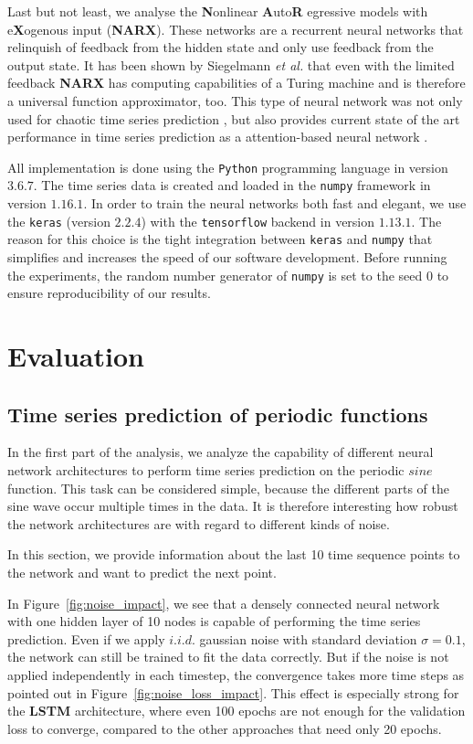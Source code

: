 \documentclass{article}
\begin{document}
Last but not least, we analyse the \textbf{N}onlinear \textbf{A}uto\textbf{R}
egressive models with e\textbf{X}ogenous input (\textbf{NARX}).
These networks are a recurrent
neural networks that relinquish of feedback from the hidden state and only use
feedback from the output state. It has been shown by Siegelmann \textit{et al.}
that even with the limited feedback \textbf{NARX} has computing capabilities of
a Turing machine \cite{siegelmann1997} and is therefore a universal function
approximator, too. This type of neural network was not only used for chaotic
time series prediction \cite{diaconescu2008}, but also provides current
state of the art performance in time series prediction as a attention-based
neural network \cite{qin2017}. 

All implementation is done using the \texttt{Python} programming language in
version $3.6.7$. The time series data is created and loaded in the
\texttt{numpy} framework in version $1.16.1$. In order to train the neural
networks both fast and elegant, we use the \texttt{keras} (version $2.2.4$)
with the
\texttt{tensorflow} backend in version $1.13.1$.
The reason for this choice is the tight
integration between \texttt{keras} and \texttt{numpy} that simplifies and
increases the speed of our software development. Before running the experiments,
the random number generator of \texttt{numpy} is set to the seed $0$ to ensure
reproducibility of our results.

\section{Evaluation} 
\subsection{Time series prediction of periodic functions}
\label{sec:sine} 
In the first part of the analysis, we analyze the capability of different neural
network architectures to perform time series prediction on the periodic $sine$
function. This task can be considered simple, because the different parts of the
sine wave occur multiple times in the data. It is therefore interesting how
robust the network architectures are with regard to different kinds of noise.

In this section, we provide information about the last 10 time sequence points
to the network and want to predict the next point.

In Figure~\ref{fig:noise_impact}, we see that a densely connected neural network
with one hidden layer of 10 nodes is capable of performing the time series
prediction. Even if we apply $i.i.d.$ gaussian noise with standard
deviation $\sigma = 0.1$, the
network can still be trained to fit the data correctly. But if the noise is not
applied independently in each timestep, the convergence takes more time steps as
pointed out in Figure~\ref{fig:noise_loss_impact}. This effect is especially 
strong for the \textbf{LSTM} architecture, where even 100 epochs are not enough
for the validation loss to converge, compared to the other approaches that need
only 20 epochs.
\end{document}
